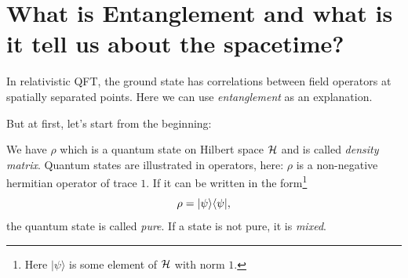 \section{What is Entanglement and what is it tell us about the spacetime? \checkmark}
	In relativistic QFT, the ground state has correlations between field operators at spatially separated points. Here we can use \textit{entanglement} as an explanation.
	
	But at first, let's start from the beginning:


	We have $\rho$ which is a quantum state on Hilbert space $\mathcal{H}$ and is called \textit{density matrix}. Quantum states are illustrated in operators, here: $\rho$ is a non-negative hermitian operator of trace $1$. If it can be written in the form\footnote{Here $|\psi\rangle$ is some element of $\mathcal{H}$ with norm $1$.}
		\begin{equation}
			\rho=| \psi \rangle\langle \psi |,
		\end{equation}
	 the quantum state is called \textit{pure}. If a state is not pure, it is \textit{mixed}.
	 
